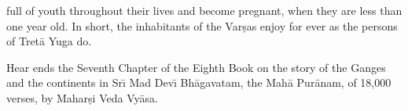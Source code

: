 full of youth throughout their lives and become pregnant, when they are less than one year old. In short, the inhabitants of the Var\d{s}as enjoy for ever as the persons of Tret\=a Yuga do.

Hear ends the Seventh Chapter of the Eighth Book on the story of the Ganges and the continents in Sr\={\i} Mad Dev\={\i} Bh\=agavatam, the Mah\=a Pur\=anam, of 18,000 verses, by Mahar\d{s}i Veda Vy\=asa.



